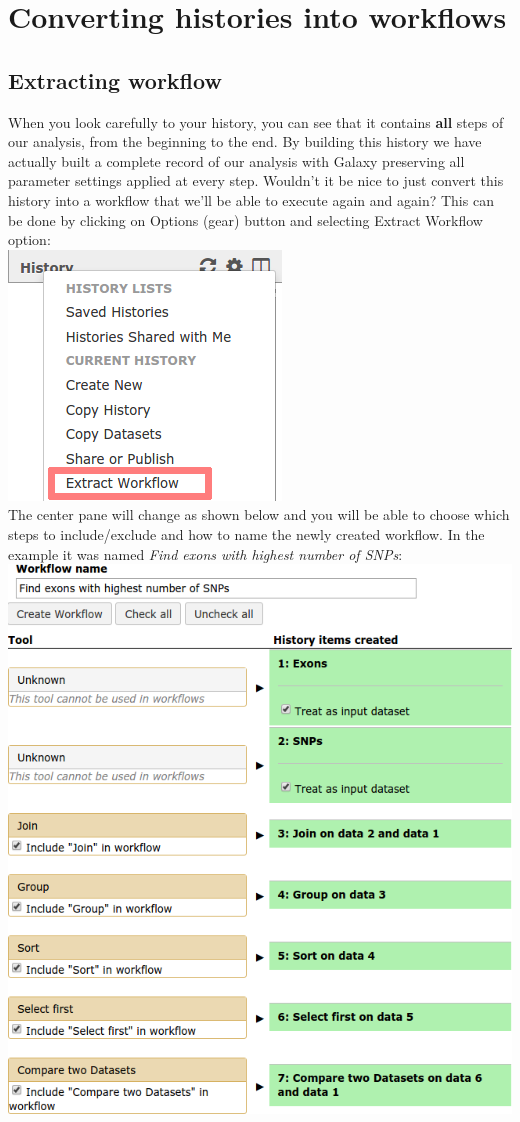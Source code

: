 \documentclass[11pt,a4paper]{article}
\begin{document}
\section{Converting histories into workflows}
\subsection{Extracting workflow}
When you look carefully to your history, you can see that it contains \textbf{all} steps of our analysis, from the beginning to the end.
By building this history we have actually built a complete record of our analysis with Galaxy preserving all parameter settings applied at every step. Wouldn't it be nice to just convert this history into a workflow that we'll be able to execute again and again? This can be done by clicking on Options (gear) button and selecting Extract Workflow option:\\
\includegraphics[scale=0.65]{figures/101_24}\\
The center pane will change as shown below and you will be able to choose which steps to include/exclude and how to name the newly created workflow. In the example it was named \textit{Find exons with highest number of SNPs}:\\
\includegraphics[scale=0.55]{figures/101_25}\\
\end{document}
